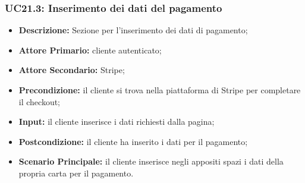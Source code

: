 \subsubsection{UC21.3: Inserimento dei dati del pagamento}
\label{sec:UC21.3}
\begin{itemize}
    \item \textbf{Descrizione:} Sezione per l'inserimento dei dati di pagamento;
    \item \textbf{Attore Primario:} cliente autenticato;
    \item \textbf{Attore Secondario:} Stripe;
    \item \textbf{Precondizione:} il cliente si trova nella piattaforma di Stripe per completare il checkout;
    \item \textbf{Input:} il cliente inserisce i dati richiesti dalla pagina;
    \item \textbf{Postcondizione:} il cliente ha inserito i dati per il pagamento;
    \item \textbf{Scenario Principale:} il cliente inserisce negli appositi spazi i dati della propria carta per il pagamento.
\end{itemize}